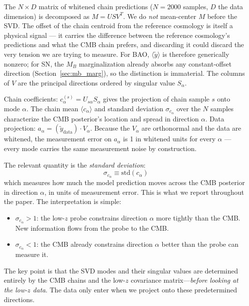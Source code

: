The $N \times D$ matrix of whitened chain predictions ($N = 2000$ samples, $D$ the data dimension) is decomposed as $M = U S V^T$. We do \emph{not} mean-center $M$ before the SVD. The offset of the chain centroid from the reference cosmology is itself a physical signal --- it carries the difference between the reference cosmology's predictions and what the CMB chain prefers, and discarding it could discard the very tension we are trying to measure. For BAO, $\langle \tilde y \rangle$ is therefore generically nonzero; for SN, the $M_B$ marginalization already absorbs any constant-offset direction (Section~\ref{sec:mb_marg}), so the distinction is immaterial. The columns of $V$ are the principal directions ordered by singular value $S_\alpha$.

Chain coefficients: $c_\alpha^{(s)} = U_{s\alpha} S_\alpha$ gives the projection of chain sample $s$ onto mode $\alpha$. The chain mean $\langle c_\alpha \rangle$ and standard deviation $\sigma_{c_\alpha}$ over the $N$ samples characterize the CMB posterior's location and spread in direction $\alpha$.
Data projection: $a_\alpha = (\tilde{y}_\mathrm{data}) \cdot V_\alpha$. Because the $V_\alpha$ are orthonormal and the data are whitened, the measurement error on $a_\alpha$ is 1 in whitened units for every $\alpha$ --- every mode carries the same measurement noise by construction.

The relevant quantity is the \emph{standard deviation}:
\begin{equation}
\sigma_{c_\alpha} \equiv \mathrm{std}(c_\alpha)
\label{eq:sigma_c}
\end{equation}
which measures how much the model prediction moves across the CMB posterior in direction $\alpha$, in units of measurement error. This is what we report throughout the paper. The interpretation is simple:
\begin{itemize}
\item $\sigma_{c_\alpha} > 1$: the low-$z$ probe constrains direction $\alpha$ more tightly than the CMB. New information flows from the probe to the CMB.
\item $\sigma_{c_\alpha} < 1$: the CMB already constrains direction $\alpha$ better than the probe can measure it.
\end{itemize}

The key point is that the SVD modes and their singular values are determined entirely by the CMB chains and the low-$z$ covariance matrix---\emph{before looking at the low-$z$ data}. The data only enter when we project onto these predetermined directions.

